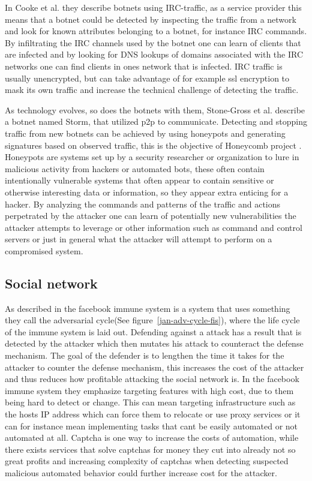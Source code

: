 In Cooke et al.\cite{jan-usenix-botnet} they describe botnets using IRC-traffic, as a service provider this means that a botnet could be detected by inspecting the traffic from a network and look for known attributes belonging to a botnet, for instance IRC commands. By infiltrating the IRC channels used by the botnet one can learn of clients that are infected and by looking for DNS lookups of domains associated with the IRC networks one can find clients in ones network that is infected. IRC traffic is usually unencrypted, but can take advantage of for example ssl encryption to mask its own traffic and increase the technical challenge of detecting the traffic.

As technology evolves, so does the botnets with them,  Stone-Gross et al. \cite{jan_stone-gross} describe a botnet named Storm, that  utilized p2p to communicate. Detecting and stopping traffic from new botnets can be achieved by using honeypots and generating signatures based on observed traffic, this is the objective of Honeycomb project \cite{jan-Kreibich}. Honeypots are systems set up by a security researcher or organization to lure in malicious activity from hackers or automated bots, these often contain intentionally vulnerable systems that often appear to contain sensitive or otherwise interesting data or information, so they appear extra enticing for a hacker. By analyzing the commands and patterns of the traffic and actions perpetrated by the attacker one can learn of potentially new vulnerabilities the attacker attempts to leverage or other information such as command and control servers or just in general what the attacker will attempt to perform on a compromised system.


\subsection{Social network}

As described in \cite{jan-fis} the facebook immune system is a system that uses something they call the adversarial cycle(See figure~\ref{jan-adv-cycle-fis}), where the life cycle of the immune system is laid out.
Defending against a attack has a result that is detected by the attacker which then mutates his attack to counteract the defense mechanism. The goal of the defender is to lengthen the time it takes for the attacker to counter the defense mechanism, this increases the cost of the attacker and thus reduces how profitable attacking the social network is. In the facebook immune system they emphasize targeting features with high cost, due to them being hard to detect or change. This can mean targeting infrastructure such as the hosts IP address which can force them to relocate or use proxy services or it can for instance mean implementing tasks that cant be easily automated or not automated at all. Captcha \cite{jan-captcha} is one way to increase the costs of automation, while there exists services that solve captchas for money they cut into already not so great profits \cite{jan-boshmaf} and increasing complexity of captchas when detecting suspected malicious automated behavior could further increase cost for the attacker.


